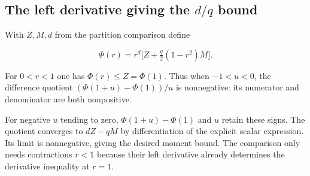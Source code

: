 \documentclass[11pt,a4paper]{report}
\begin{document}
\subsection{\texorpdfstring{The left derivative giving the \(d/q\) bound}{The left derivative giving the d/q bound}}
\label{report-step-ProximalLangevin-SharpConcentration-lean-3}


With \(Z,M,d\) from the partition comparison define

\[\Phi(r)=r^d\bigl[Z+\tfrac q2(1-r^2)M\bigr].\]

For \(0<r<1\) one has \(\Phi(r)\le Z=\Phi(1)\). Thus when \(-1<u<0\), the difference quotient \((\Phi(1+u)-\Phi(1))/u\) is nonnegative: its numerator and denominator are both nonpositive.



For negative \(u\) tending to zero, \(\Phi(1+u)-\Phi(1)\) and \(u\) retain these signs. The quotient converges to \(dZ-qM\) by differentiation of the explicit scalar expression. Its limit is nonnegative, giving the desired moment bound. The comparison only needs contractions \(r<1\) because their left derivative already determines the derivative inequality at \(r=1\).
\end{document}

